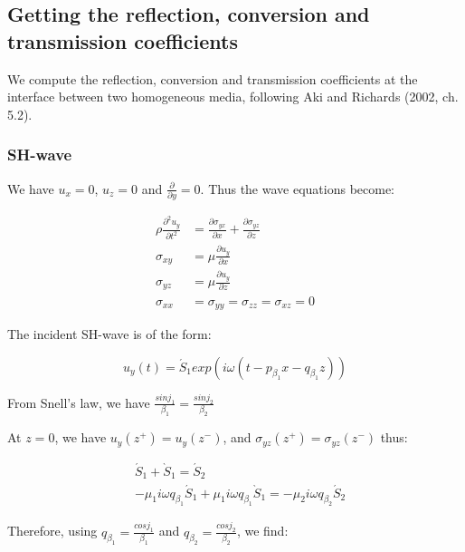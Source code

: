 \documentclass[methods.tex]{subfiles}
\begin{document}
\subsection{Getting the reflection, conversion and transmission coefficients}

We compute the reflection, conversion and transmission coefficients at the interface between two homogeneous media, following Aki and Richards (2002, ch. 5.2).

\subsubsection{SH-wave}

We have $u_x = 0$, $u_z = 0$ and $\frac{\partial}{\partial y} = 0$. Thus the wave equations become:

\begin{equation}
\begin{split}
\rho \frac{\partial ^2 u_y}{\partial t^2} & = \frac{\partial \sigma_{yx}}{\partial x} + \frac{\partial \sigma_{yz}}{\partial z} \\
\sigma_{xy} & = \mu \frac{\partial u_y}{\partial x} \\
\sigma_{yz} & = \mu \frac{\partial u_y}{\partial z} \\
\sigma_{xx} & = \sigma_{yy} = \sigma_{zz} = \sigma_{xz} = 0
\end{split}
\end{equation}

The incident SH-wave is of the form:

\begin{equation}
u_y (t) = \acute S_1 exp (i \omega (t - p_{\beta_1} x - q_{\beta_1} z))
\end{equation}

From Snell's law, we have $\frac{sin j_1}{\beta_1} = \frac{sin j_2}{\beta_2}$

At $z = 0$, we have $u_y (z^+) = u_y (z^-)$, and $\sigma_{yz} (z^+) = \sigma_{yz} (z^-)$ thus:

\begin{equation}
\begin{split}
& \acute S_1 + \grave S_1 = \acute S_2 \\
& - \mu_1 i \omega q_{\beta_1} \acute S_1 + \mu_1 i \omega q_{\beta_1} \grave S_1 = - \mu_2 i \omega q_{\beta_2} \acute S_2
\end{split}
\end{equation}

Therefore, using $q_{\beta_1} = \frac{cos j_1}{\beta_1}$ and $q_{\beta_2} = \frac{cos j_2}{\beta_2}$, we find:
\end{document}
